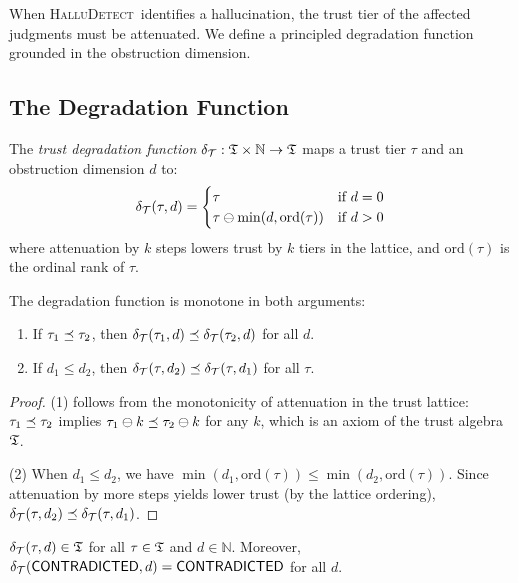 \documentclass[11pt]{article}
\newcommand{\HalluDetect}{\textsc{HalluDetect}}
\newcommand{\DegradeFn}{\delta_\trust}
\begin{document}
When \HalluDetect\ identifies a hallucination, the trust tier of the
affected judgments must be attenuated.  We define a principled degradation
function grounded in the obstruction dimension.

\subsection{The Degradation Function}

\begin{definition}\label{def:trust-degrade}
The \emph{trust degradation function} $\DegradeFn : \Talg \times \mathbb{N}
\to \Talg$ maps a trust tier $\tau$ and an obstruction dimension $d$ to:
\[
  \DegradeFn(\tau, d) = \begin{cases}
    \tau & \text{if } d = 0 \\
    \tau \tatten \min(d, \mathrm{ord}(\tau)) & \text{if } d > 0
  \end{cases}
\]
where attenuation by $k$ steps lowers trust by $k$ tiers in the
lattice, and $\mathrm{ord}(\tau)$ is the ordinal rank of $\tau$.
\end{definition}

\begin{theorem}[Monotonicity]\label{thm:degrade-mono}
The degradation function is monotone in both arguments:
\begin{enumerate}[noitemsep]
  \item If $\tau_1 \preceq \tau_2$, then
        $\DegradeFn(\tau_1, d) \tleq \DegradeFn(\tau_2, d)$ for all $d$.
  \item If $d_1 \leq d_2$, then
        $\DegradeFn(\tau, d_2) \tleq \DegradeFn(\tau, d_1)$ for all $\tau$.
\end{enumerate}
\end{theorem}

\begin{proof}
(1) follows from the monotonicity of attenuation in the trust lattice:
$\tau_1 \preceq \tau_2$ implies $\tau_1 \ominus k \preceq \tau_2 \ominus k$
for any $k$, which is an axiom of the trust algebra $\mathfrak{T}$.

(2) When $d_1 \leq d_2$, we have $\min(d_1, \mathrm{ord}(\tau)) \leq
\min(d_2, \mathrm{ord}(\tau))$.  Since attenuation by more steps yields
lower trust (by the lattice ordering), $\DegradeFn(\tau, d_2) \tleq
\DegradeFn(\tau, d_1)$.
\end{proof}

\begin{theorem}\label{thm:lattice-pres}
$\DegradeFn(\tau, d) \in \Talg$ for all $\tau \in \mathfrak{T}$ and
$d \in \mathbb{N}$.  Moreover, $\DegradeFn(\Tcontra, d) = \Tcontra$
for all $d$.
\end{theorem}
\end{document}
